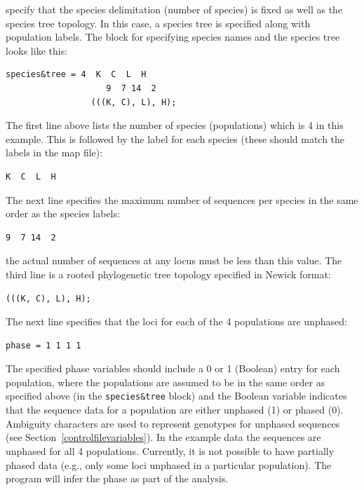 \documentclass[a4paper]{book}
\numberwithin{equation}{section} \renewcommand{\baselinestretch}{0.55}
\begin{document}
specify that the species delimitation (number of species) is fixed as
well as the species tree topology. In this case,
a species tree is specified along with population labels.
The block for specifying species names
and the species tree looks like this:
{\small
\begin{verbatim}
species&tree = 4  K  C  L  H
                    9  7 14  2
                 (((K, C), L), H);
\end{verbatim}
}
\noindent
The first line above lists the number of species (populations) which is
4 in this example. This is followed
by the label for each species (these should match the labels in the map
file):
\begin{verbatim}
K  C  L  H
\end{verbatim}
The next line specifies the maximum number of sequences per
species in the same order as the species labels:
\begin{verbatim}
9  7 14  2
\end{verbatim}
the actual number of sequences at any locus must be less than this value.
The third line is a rooted phylogenetic tree topology specified in
Newick format:
\begin{verbatim}
(((K, C), L), H);
\end{verbatim}
The next line specifies that the loci for each of the 4 populations
are unphased:
\begin{verbatim}
phase = 1 1 1 1
\end{verbatim}
The specified phase variables should include a 0 or 1 (Boolean) entry for each population, 
where the populations are assumed to be in the same order as specified above
(in the \texttt{species\&tree} block)
and the Boolean variable indicates that the sequence data for a population
are either unphased (1) or phased (0). Ambiguity characters are used to represent
genotypes for unphased sequences (see Section~\ref{controlfilevariables}).
In the example data the sequences are unphased for all 4 populations.
Currently, it is not possible to have partially phased data (e.g., only
some loci unphased in a particular population). The program will infer
the phase as part of the analysis.
\end{document}
